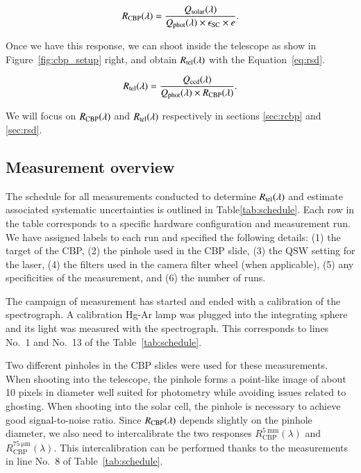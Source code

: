 \begin{equation}
    R_{\mathrm{CBP}}(\lambda) = \frac{Q_{\mathrm{solar}}(\lambda)}{Q_{\mathrm{phot}}(\lambda) \times \epsilon_{\mathrm{SC}} \times e}.
    \label{eq:rcbp}
\end{equation} 

Once we have this response, we can shoot inside the \SD telescope as show in Figure~\ref{fig:cbp_setup} right, and obtain $R_{\mathrm{tel}}(\lambda)$ with the Equation~\ref{eq:rsd}.

\begin{equation}
    R_{\mathrm{tel}}(\lambda) = \frac{Q_{\mathrm{ccd}}(\lambda)}{Q_{\mathrm{phot}}(\lambda) \times R_{\mathrm{CBP}}(\lambda)}.
    \label{eq:rsd}
\end{equation}

We will focus on $R_{\mathrm{CBP}}(\lambda)$ and $R_{\mathrm{tel}}(\lambda)$ respectively in sections \ref{sec:rcbp} and \ref{sec:rsd}.

\subsection{Measurement overview}
\label{sec:strategy}

The schedule for all measurements conducted to determine $R_{\mathrm{tel}}(\lambda)$ and estimate associated systematic uncertainties is outlined in Table\ref{tab:schedule}. Each row in the table corresponds to a specific hardware configuration and measurement run. We have assigned labels to each run and specified the following details: (1) the target of the CBP, (2) the pinhole used in the CBP slide, (3) the QSW setting for the laser, (4) the filters used in the \SD camera filter wheel (when applicable), (5) any specificities of the measurement, and (6) the number of runs.

The campaign of measurement has started and ended with a calibration of the spectrograph. A calibration Hg-Ar lamp was plugged into the integrating sphere and its light was measured with the spectrograph. This corresponds to lines No.~1 and No.~13 of the Table~\ref{tab:schedule}.

Two different pinholes in the CBP slides were used for these measurements. When shooting into the \SD telescope, the \spinhole pinhole forms a point-like image of about 10 pixels in diameter well suited for photometry while avoiding issues related to ghosting. When shooting into the solar cell, the \bpinhole pinhole is necessary to achieve good signal-to-noise ratio. Since $R_{\mathrm{CBP}}(\lambda)$ depends slightly on the pinhole diameter, we also need to intercalibrate the two responses $R_\mathrm{CBP}^{\mathrm{\SI{5}{\milli\meter}}} (\lambda)$ and $R_\mathrm{CBP}^{\mathrm{\SI{75}{\micro\meter}}} (\lambda)$. This intercalibration can be performed thanks to the measurements in line No.~8 of Table~\ref{tab:schedule}.

